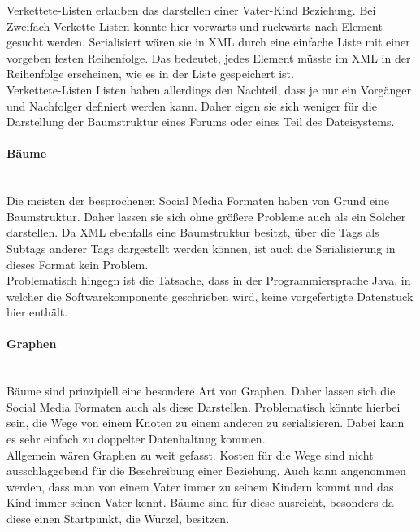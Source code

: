 \documentclass[a4paper]{article}
\begin{document}
	Verkettete-Listen erlauben das darstellen einer Vater-Kind Beziehung. Bei
	Zweifach-Verkette-Listen könnte hier vorwärts und rückwärts nach Element
	gesucht werden. Serialisiert wären sie in XML durch eine einfache Liste
	mit einer vorgeben festen Reihenfolge. Das bedeutet, jedes Element müsste
	im XML in der Reihenfolge erscheinen, wie es in der Liste gespeichert ist. \\
	
	Verkettete-Listen Listen haben allerdings den Nachteil, dass je nur ein
	Vorgänger und Nachfolger definiert werden kann. Daher eigen sie sich weniger
	für die Darstellung der Baumstruktur eines Forums oder eines Teil des
	Dateisystems. 	
	
	\paragraph{Bäume}\mbox{} \\
	
	Die meisten der besprochenen Social Media Formaten haben von Grund eine
	Baumstruktur. Daher lassen sie sich ohne größere Probleme auch als ein
	Solcher darstellen. Da XML ebenfalls eine Baumstruktur besitzt, über
	die Tags als Subtags anderer Tags dargestellt werden können, ist auch
	die Serialisierung in dieses Format kein Problem. \\
	
	Problematisch hingegn ist die Tatsache, dass in der Programmiersprache 
	Java, in welcher die Softwarekomponente geschrieben wird, keine vorgefertigte
	Datenstuck hier	enthält.
	
	\paragraph{Graphen}\mbox{} \\
	
	Bäume sind prinzipiell eine besondere Art von Graphen. Daher lassen sich
	die Social Media Formaten auch als diese Darstellen. Problematisch
	könnte hierbei sein, die Wege von einem Knoten zu einem anderen zu
	serialisieren. Dabei kann es sehr einfach zu doppelter Datenhaltung kommen. \\
	
	Allgemein wären Graphen zu weit gefasst. Kosten für die Wege sind nicht
	ausschlaggebend für die Beschreibung einer Beziehung. Auch kann angenommen
	werden, dass man von einem Vater immer zu seinem Kindern kommt und das Kind
	immer seinen Vater kennt. Bäume sind für diese ausreicht, besonders da diese
	einen Startpunkt, die Wurzel, besitzen.
	
\end{document}
